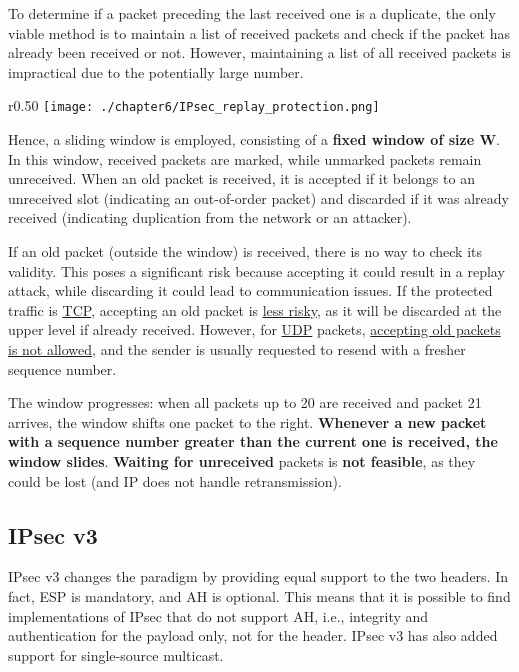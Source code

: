 To determine if a packet preceding the last received one is a duplicate, the only viable method is to maintain a list of received packets and check if the packet has already been received or not. However, maintaining a list of all received packets is impractical due to the potentially large number.

\begin{wrapfigure}{r}{0.50\textwidth}
    \centering
    \texttt{[image: ./chapter6/IPsec\_replay\_protection.png]}
\end{wrapfigure}

Hence, a sliding window is employed, consisting of a \textbf{fixed window of size W}. In this window, received packets are marked, while unmarked packets remain unreceived. When an old packet is received, it is accepted if it belongs to an unreceived slot (indicating an out-of-order packet) and discarded if it was already received (indicating duplication from the network or an attacker).


If an old packet (outside the window) is received, there is no way to check its validity. This poses a significant risk because accepting it could result in a replay attack, while discarding it could lead to communication issues. If the protected traffic is \underline{TCP}, accepting an old packet is \underline{less risky}, as it will be discarded at the upper level if already received. However, for \underline{UDP} packets, \underline{accepting old packets is not allowed}, and the sender is usually requested to resend with a fresher sequence number.

The window progresses: when all packets up to 20 are received and packet 21 arrives, the window shifts one packet to the right. \textbf{Whenever a new packet with a sequence number greater than the current one is received, the window slides}. \textbf{Waiting for unreceived} packets is \textbf{not feasible}, as they could be lost (and IP does not handle retransmission).

\subsection{IPsec v3}

IPsec v3 changes the paradigm by providing equal support to the two headers. In fact, ESP is mandatory, and AH is optional. This means that it is possible to find implementations of IPsec that do not support AH, i.e., integrity and authentication for the payload only, not for the header. IPsec v3 has also added support for single-source multicast.

